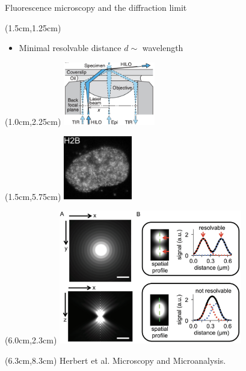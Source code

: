 \documentclass{beamer}					%
\begin{document}
\begin{frame}{Fluorescence microscopy and the diffraction limit}

\begin{textblock*}{10cm}(1.5cm,1.25cm)
\begin{itemize}
\item Minimal resolvable distance $d \sim$ wavelength
\end{itemize}
\end{textblock*}

\begin{textblock*}{4cm}(1.0cm,2.25cm)
\includegraphics[width=4cm]{../../dissertation/dissertation/media/HILO}
\end{textblock*}

\begin{textblock*}{3cm}(1.5cm,5.75cm)
\includegraphics[width=3cm]{../../dissertation/dissertation/media/Widefield}
\end{textblock*}


\begin{textblock*}{8cm}(6.0cm,2.3cm)
\includegraphics[width=8cm]{../../dissertation/dissertation/media/PSF}
\end{textblock*}

\begin{textblock*}{8cm}(6.3cm,8.3cm)
Herbert et al. Microscopy and Microanalysis.
\end{textblock*}


\end{frame}
\end{document}
